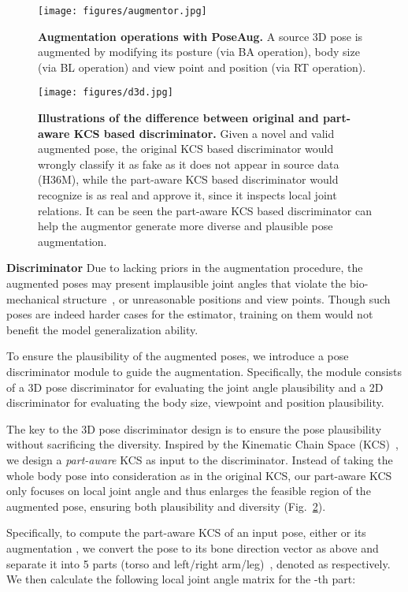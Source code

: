 \documentclass[final]{cvpr}
\newcommand{\myparagraph}[1]{{ \noindent \bf #1}}
\begin{document}
\begin{figure}[!t]
\centering
\texttt{[image: figures/augmentor.jpg]}
\caption{\textbf{Augmentation operations with PoseAug.} 
A source 3D pose is augmented by modifying its posture (via BA operation), body size (via BL operation) and view point and position (via RT operation).}
\label{fig:augmentor}
\end{figure}

\begin{figure}[!t]
\centering
\texttt{[image: figures/d3d.jpg]}
\caption{\textbf{Illustrations of the difference between original and part-aware KCS based discriminator.} 
{Given a novel and valid augmented pose, the original KCS based discriminator would wrongly classify it as fake as it does not appear in source data (H36M), while the part-aware KCS based discriminator would recognize is as real and approve it, since it inspects local joint relations. 
It can be seen the part-aware KCS based discriminator can help the augmentor generate more diverse and plausible pose augmentation.}} 
\label{fig:d3d}
\end{figure}

\myparagraph{Discriminator}
Due to lacking priors in the augmentation procedure, the augmented poses may present implausible joint angles that violate the bio-mechanical structure~\cite{akhter2015joint_angle_limit}, or unreasonable positions and view points. 
Though such poses are indeed harder cases for the estimator, training on them would not benefit the model generalization ability. 


To ensure the plausibility of the augmented poses, we introduce a pose discriminator module to guide the augmentation.
Specifically, the module consists of a 3D pose  discriminator  for evaluating the joint angle plausibility and a 2D discriminator  for evaluating the body size, viewpoint and position plausibility. 

The key to the 3D pose discriminator design is to ensure the pose plausibility without sacrificing the diversity.  
Inspired by the Kinematic Chain Space (KCS)~\cite{wandt2019repnet}, we design a \textit{part-aware} KCS as input to the discriminator. Instead of taking the whole body pose into consideration as in the original KCS, our part-aware KCS only focuses on local joint angle and thus enlarges the feasible region of the augmented pose, ensuring both plausibility and diversity (Fig.~\ref{fig:d3d}).

Specifically, to compute the part-aware KCS of an input pose, either  or its augmentation ,  we convert the pose to its bone direction vector  as above and separate it into 5 parts (torso and left/right arm/leg)~\cite{akhter2015joint_angle_limit},  denoted as  respectively.
We then calculate the following local joint angle matrix  for the -th part:
\end{document}
